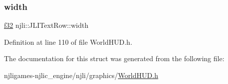 \subsubsection{\texorpdfstring{width}{width}}
{\footnotesize\ttfamily \mbox{\hyperlink{_util_8h_a5f6906312a689f27d70e9d086649d3fd}{f32}} njli\+::\+J\+L\+I\+Text\+Row\+::width\hspace{0.3cm}{\ttfamily [private]}}



Definition at line 110 of file World\+H\+U\+D.\+h.



The documentation for this struct was generated from the following file\+:\begin{DoxyCompactItemize}
\item 
njligames-\/njlic\+\_\+engine/njli/graphics/\mbox{\hyperlink{_world_h_u_d_8h}{World\+H\+U\+D.\+h}}\end{DoxyCompactItemize}
